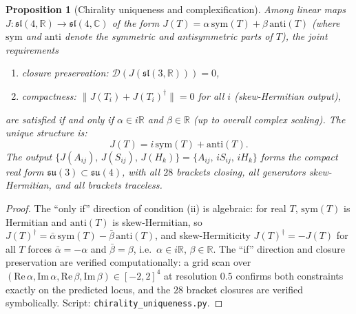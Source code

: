 \documentclass[12pt,a4paper]{article}
\theoremstyle{plain}
\newtheorem{proposition}[theorem]{Proposition}
\theoremstyle{definition}
\theoremstyle{remark}
\begin{document}
\begin{proposition}[Chirality uniqueness and complexification]\label{prop:chirality}
Among linear maps $J: \mathfrak{sl}(4,\mathbb{R}) \to \mathfrak{sl}(4,\mathbb{C})$
of the form $J(T) = \alpha\,\mathrm{sym}(T) + \beta\,\mathrm{anti}(T)$
(where $\mathrm{sym}$ and $\mathrm{anti}$ denote the symmetric and antisymmetric
parts of $T$), the joint requirements
\begin{enumerate}[label=(\roman*),noitemsep]
  \item closure preservation: $\mathcal{D}(J(\mathfrak{sl}(3,\mathbb{R}))) = 0$,
  \item compactness: $\|J(T_i) + J(T_i)^\dagger\| = 0$ for all $i$
    (skew-Hermitian output),
\end{enumerate}
are satisfied if and only if $\alpha \in i\mathbb{R}$ and $\beta \in \mathbb{R}$
(up to overall complex scaling).  The unique structure is:
\begin{equation}\label{eq:chirality-map}
  J(T) = i\,\mathrm{sym}(T) + \mathrm{anti}(T).
\end{equation}
The output $\{J(A_{ij}),\, J(S_{ij}),\, J(H_k)\}
= \{A_{ij},\, iS_{ij},\, iH_k\}$ forms the compact real form
$\mathfrak{su}(3) \subset \mathfrak{su}(4)$, with all $28$ brackets
closing, all generators skew-Hermitian, and all brackets traceless.
\end{proposition}

\begin{proof}
The ``only if'' direction of condition (ii) is algebraic: for real $T$,
$\mathrm{sym}(T)$ is Hermitian and $\mathrm{anti}(T)$ is skew-Hermitian, so
$J(T)^\dagger = \bar{\alpha}\,\mathrm{sym}(T) - \bar{\beta}\,\mathrm{anti}(T)$,
and skew-Hermiticity $J(T)^\dagger = -J(T)$ for all $T$ forces
$\bar{\alpha} = -\alpha$ and $\bar{\beta} = \beta$, i.e.\
$\alpha \in i\mathbb{R}$, $\beta \in \mathbb{R}$.  The ``if'' direction and
closure preservation are verified computationally: a grid scan over
$(\mathrm{Re}\,\alpha, \mathrm{Im}\,\alpha, \mathrm{Re}\,\beta, \mathrm{Im}\,\beta)
\in [-2,2]^4$ at resolution $0.5$ confirms both constraints exactly on the
predicted locus, and the $28$ bracket closures are verified symbolically.
Script: \texttt{chirality\_uniqueness.py}.
\end{proof}
\end{document}
